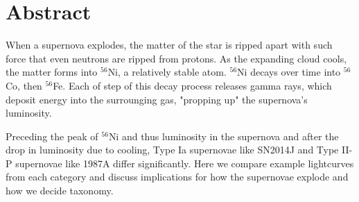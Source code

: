 \section{Abstract}
When a supernova explodes, the matter of the star is ripped apart with such force that even neutrons are ripped from protons. As the expanding cloud cools, the matter forms into $^{56}$Ni, a relatively stable atom. $^{56}$Ni decays over time into $^{56}$Co, then $^{56}$Fe. Each of step of this decay process releases gamma rays, which deposit energy into the surrounging gas, "propping up" the supernova's luminosity. 

Preceding the peak of $^{56}$Ni and thus luminosity in the supernova and after the drop in luminosity due to cooling, Type Ia supernovae like SN2014J and Type II-P supernovae like 1987A differ significantly. Here we compare example lightcurves from each category and discuss implications for how the supernovae explode and how we decide taxonomy.



